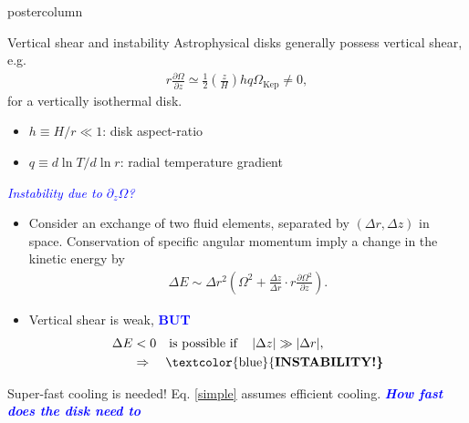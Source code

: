 \documentclass[final,hyperref={pdfpagelabels=false}]{beamer}
\newcommand{\p}{\partial}
\begin{document}
\begin{frame}
\begin{columns}
\begin{column}{.49\textwidth}
\begin{beamercolorbox}[center,wd=\textwidth]{postercolumn}
\begin{minipage}[T]{.95\textwidth}
{            \begin{block}{{\Large Vertical shear and instability}}
              \justifying
              Astrophysical disks generally possess vertical
              shear, e.g. 
              \begin{align}
                r\frac{\p \Omega}{\p z} \simeq
                \frac{1}{2}\left(\frac{z}{H}\right)h q
                \Omega_\mathrm{Kep}\neq 0,
              \end{align}
              for a vertically isothermal disk. 
              \begin{itemize}
              \item $h \equiv H/r \ll 1$: disk aspect-ratio
              \item $q \equiv d \ln{T}/d\ln{r}$: radial temperature gradient
              \end{itemize}
              \textcolor{blue}{\emph{Instability due to $\p_z\Omega$?}}
              \begin{itemize}
              \item 
                Consider an exchange of two fluid elements, separated by 
                $(\Delta r,\Delta z)$ in space. Conservation
                of specific angular momentum imply a change in the
                kinetic energy by
                \begin{align}
                  \Delta E  \sim \Delta r^2 \left(\Omega^2 +
                    \frac{\Delta z}{\Delta r}\cdot r\frac{\p\Omega^2}{\p
                      z}\right). \label{simple}
                \end{align}
                \item Vertical shear is weak, \textcolor{blue}{{\bf BUT}}  
                \begin{align}
                  \Delta E &<  0 \quad \text{is possible if} \quad \left|\Delta
                    z\right|\gg 
                  |\Delta r|,\\
                  &\Rightarrow \quad \text{\textcolor{blue}{\bf
                      INSTABILITY!}}\notag 
                \end{align}
              \end{itemize}
            \end{block}
            \vfill
            \begin{block}{{\Large Super-fast cooling is needed!}}
              \justifying
              Eq. \ref{simple} assumes efficient cooling. 
              \textcolor{blue}{\emph{\bf{How fast does the disk need to
}}}
\end{block}}
\end{minipage}
\end{beamercolorbox}
\end{column}
\end{columns}
\end{frame}
\end{document}
